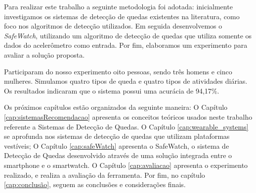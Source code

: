 Para realizar este trabalho a seguinte metodologia foi adotada: inicialmente investigamos os sistemas de detecção de quedas existentes na literatura, como foco nos algoritmos de detecção utilizados. Em seguida desenvolvemos o \textit{SafeWatch}, utilizando um algoritmo de detecção de quedas que utiliza somente os dados do acelerômetro como entrada. Por fim, elaboramos um experimento para avaliar a solução proposta.  

Participaram do nosso experimento oito pessoas, sendo três homens e cinco mulheres. Simulamos quatro tipos de queda e quatro tipos de atividades diárias. Os resultados indicaram que o sistema possui uma acurácia de 94,17\%.
 

Os próximos capítulos estão organizados da seguinte maneira: O Capítulo \ref{cap:sistemasRecomendacao} apresenta os conceitos teóricos usados neste trabalho referente a Sistemas de Detecção de Quedas. O Capítulo \ref{cap:wearable_systems} se aprofunda nos sistemas de detecção de quedas que utilizam plataformas vestíveis; O Capítulo \ref{cap:safeWatch} apresenta o SafeWatch, o sistema de Detecção de Quedas desenvolvido através de uma solução integrada entre o smartphone e o smartwatch. O Capítulo \ref{cap:avaliacao} apresenta o experimento realizado, e realiza a avaliação da ferramenta. Por fim, no capítulo \ref{cap:conclusão}, seguem as conclusões e considerações finais. 

